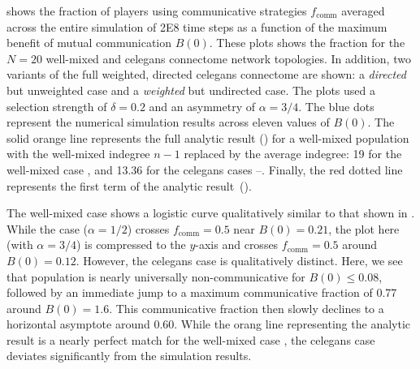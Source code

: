\documentclass[pdflatex,lineno,referee,sn-mathphys-ay]{sn-jnl}
\begin{document}
 shows the fraction of players
using communicative strategies $f_{\text{comm}}$ averaged across
the entire simulation of \num{2E8} time steps as a function
of the maximum benefit of mutual communication $B(0)$.
These plots shows the fraction for the
$N=20$ well-mixed and
\gls{celegans} connectome network topologies.
In addition, two variants of the full weighted, directed \gls{celegans}
connectome are shown:
a  \emph{directed} but unweighted case
and
a  \emph{weighted} but undirected case.
The plots used a selection strength of $\delta=0.2$
and an asymmetry of $\alpha=3/4$.
The blue dots represent the numerical simulation results across eleven
values of $B(0)$.
The solid orange line represents the full analytic
result () for a well-mixed population
with the well-mixed indegree $n-1$ replaced by the average
indegree: \num{19} for the well-mixed case ,
and \num{13.36} for the \gls{celegans} cases
--.
Finally, the red dotted line represents the first term
of the analytic result~().

The well-mixed case  shows a logistic curve
qualitatively similar to that shown in \citet{tripp2022evolutionary}.
While the \citet{tripp2022evolutionary} case ($\alpha = 1/2$)
crosses $f_{\text{comm}} = 0.5$ near $B(0) = 0.21$,
the plot here (with $\alpha = 3/4$) is compressed to the $y$-axis
and crosses $f_{\text{comm}} = 0.5$ around $B(0) = 0.12$.
However, the \gls{celegans} case 
is qualitatively distinct.
Here, we see that population is nearly universally non-communicative
for $B(0) \le 0.08$,
followed by an immediate jump to a maximum communicative fraction
of \num{0.77} around $B(0) = 1.6$.
This communicative fraction then slowly declines
to a horizontal asymptote around \num{0.60}.
While the orang line representing the analytic result
is a nearly perfect match for the well-mixed case ,
the \gls{celegans} case  deviates significantly
from the simulation results.
\end{document}
